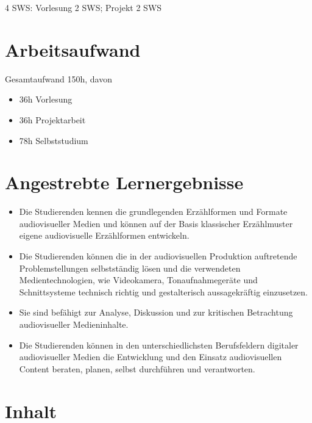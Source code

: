 4 SWS: Vorlesung 2 SWS; Projekt 2 SWS

\hypertarget{arbeitsaufwandpathlabelmi-2017modulbeschreibungen-bachelorba_avm}{%
\section*{Arbeitsaufwand\label{/mi-2017/modulbeschreibungen-bachelor/BA_AVM}}\label{arbeitsaufwandpathlabelmi-2017modulbeschreibungen-bachelorba_avm}}

Gesamtaufwand 150h, davon

\begin{itemize}
\tightlist
\item
  36h Vorlesung
\item
  36h Projektarbeit
\item
  78h Selbststudium
\end{itemize}

\hypertarget{angestrebte-lernergebnissepathlabelmi-2017modulbeschreibungen-bachelorba_avm}{%
\section*{Angestrebte
Lernergebnisse\label{/mi-2017/modulbeschreibungen-bachelor/BA_AVM}}\label{angestrebte-lernergebnissepathlabelmi-2017modulbeschreibungen-bachelorba_avm}}

\begin{itemize}
\tightlist
\item
  Die Studierenden kennen die grundlegenden Erzählformen und Formate
  audiovisueller Medien und können auf der Basis klassischer
  Erzählmuster eigene audiovisuelle Erzählformen entwickeln.
\item
  Die Studierenden können die in der audiovisuellen Produktion
  auftretende Problemstellungen selbstständig lösen und die verwendeten
  Medientechnologien, wie Videokamera, Tonaufnahmegeräte und
  Schnittsysteme technisch richtig und gestalterisch aussagekräftig
  einzusetzen.
\item
  Sie sind befähigt zur Analyse, Diskussion und zur kritischen
  Betrachtung audiovisueller Medieninhalte.
\item
  Die Studierenden können in den unterschiedlichsten Berufsfeldern
  digitaler audiovisueller Medien die Entwicklung und den Einsatz
  audiovisuellen Content beraten, planen, selbst durchführen und
  verantworten.
\end{itemize}

\hypertarget{inhaltpathlabelmi-2017modulbeschreibungen-bachelorba_avm}{%
\section*{Inhalt\label{/mi-2017/modulbeschreibungen-bachelor/BA_AVM}}\label{inhaltpathlabelmi-2017modulbeschreibungen-bachelorba_avm}}

